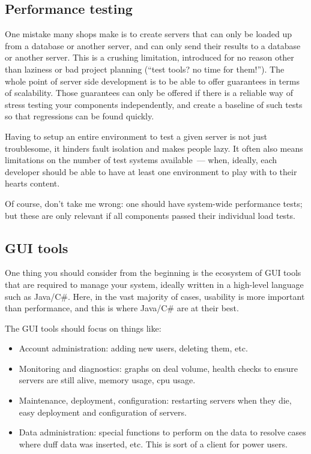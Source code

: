 \documentclass{book}
\begin{document}
\subsection{Performance testing}

One mistake many shops make is to create servers that can only be
loaded up from a database or another server, and can only send their
results to a database or another server. This is a crushing
limitation, introduced for no reason other than laziness or bad
project planning (``test tools? no time for them!''). The whole point
of server side development is to be able to offer guarantees in terms
of scalability. Those guarantees can only be offered if there is a
reliable way of stress testing your components independently, and
create a baseline of such tests so that regressions can be found
quickly.

Having to setup an entire environment to test a given server is not
just troublesome, it hinders fault isolation and makes people lazy. It
often also means limitations on the number of test systems
available~--- when, ideally, each developer should be able to have at
least one environment to play with to their hearts content.

Of course, don't take me wrong: one should have system-wide
performance tests; but these are only relevant if all components
passed their individual load tests.

\subsection{GUI tools}

One thing you should consider from the beginning is the ecosystem of
GUI tools that are required to manage your system, ideally written in
a high-level language such as Java/C\#. Here, in the vast majority of
cases, usability is more important than performance, and this is where
Java/C\# are at their best.

The GUI tools should focus on things like:

\begin{itemize}
\item Account administration: adding new users, deleting them, etc.
\item Monitoring and diagnostics: graphs on deal volume, health checks
  to ensure servers are still alive, memory usage, cpu usage.
\item Maintenance, deployment, configuration: restarting servers when
  they die, easy deployment and configuration of servers.
\item Data administration: special functions to perform on the data to
  resolve cases where duff data was inserted, etc. This is sort of a
  client for power users.
\end{itemize}
\end{document}
